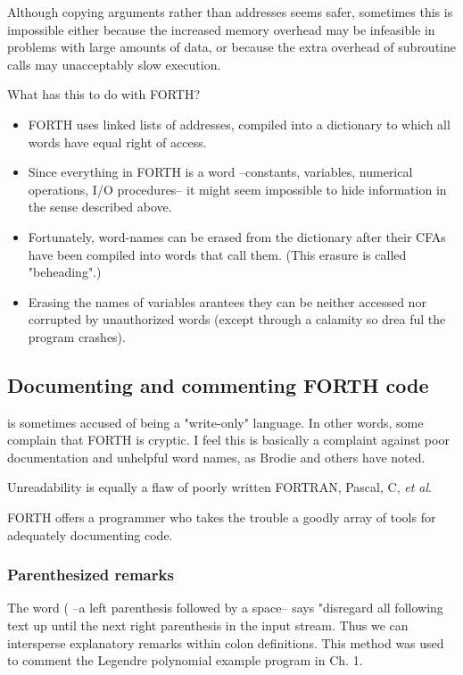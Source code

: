 Although copying arguments rather than addresses seems safer, sometimes this is impossible either because the increased memory overhead may be infeasible in problems with large amounts of data, or because the extra overhead of subroutine calls may unacceptably slow execution.

What has this to do with FORTH?

\begin{itemize}
    \item FORTH uses linked lists of addresses, compiled into a dictionary to which all words have equal right of access.
    \item Since everything in FORTH is a word --constants, variables, numerical operations, I/O procedures-- it might seem impossible to hide information in the sense described above.
    \item Fortunately, word-names can be erased from the dictionary after their CFAs have been compiled into words that call them. (This erasure is called "beheading".)
    \item Erasing the names of variables arantees they can be neither accessed nor corrupted by unauthorized words (except through a calamity so drea ful the program crashes).
\end{itemize}

\subsection{Documenting and commenting FORTH code}

 is sometimes accused of being a "write-only" language. In other words, some complain that FORTH is cryptic. I feel this is basically a complaint against poor documentation and unhelpful word names, as Brodie and others have noted.

Unreadability is equally a flaw of poorly written FORTRAN, Pascal, C, \textit{et al}.

FORTH offers a programmer who takes the trouble a goodly array of tools for adequately documenting code.

\subsubsection{Parenthesized remarks}
The word ( --a left parenthesis followed by a space-- says "disregard all following text up until the next right parenthesis in the input stream. Thus we can intersperse explanatory remarks within colon definitions. This method was used to comment the Legendre polynomial example program in Ch. 1.

